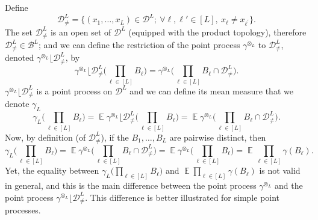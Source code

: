 \documentclass[twoside,11pt]{book}
\numberwithin{theorem}{chapter}
\numberwithin{definition}{chapter}
\numberwithin{proposition}{chapter}
\numberwithin{corollary}{chapter}
\numberwithin{example}{chapter}
\numberwithin{lemma}{chapter}
\numberwithin{assumption}{chapter}
\numberwithin{equation}{chapter}
\numberwithin{figure}{chapter}
\DeclareMathOperator{\EX}{\mathbb{E}}
\begin{document}
Define 
\begin{equation}
\mathcal{D}_{\neq}^{L} = \{ (x_{1}, \dots, x_{L}) \in \mathcal{D}^{L}; \: \forall \ell,\ell' \in [L], \: x_{\ell} \neq x_{\ell^{'}} \}.
\end{equation}
The set $\mathcal{D}_{\neq}^{L}$ is an open set of $\mathcal{D}^{L}$ (equipped with the product topology), therefore $\mathcal{D}_{\neq}^{L} \in \mathcal{B}^{L}$; and we can define the restriction of the point process $\gamma^{\otimes_L}$ to $\mathcal{D}_{\neq}^{L}$, denoted $\gamma^{\otimes_{L}} \lfloor \mathcal{D}_{\neq}^{L}$, by
\begin{equation}
\gamma^{\otimes_{L}} \lfloor \mathcal{D}_{\neq}^{L} \big(\prod\limits_{\ell \in [L]} B_\ell \big) = \gamma^{\otimes_{L}} \big( \prod\limits_{\ell \in [L]} B_\ell \cap \mathcal{D}_{\neq}^{L}   \big).
\end{equation}
$\gamma^{\otimes_{L}} \lfloor \mathcal{D}_{\neq}^{L}$ is a point process on $\mathcal{D}^L$ and we can define its mean measure that we denote $\gamma_L$ 
\begin{equation}
\gamma_{L} \big(\prod\limits_{\ell \in [L]} B_{\ell} \big)  = \EX \gamma^{\otimes_{L}} \lfloor \mathcal{D}_{\neq}^{L} \big( \prod\limits_{\ell \in [L]} B_{\ell} \big) = \EX \gamma^{\otimes_{L}} \big( \prod\limits_{\ell \in [L]} B_\ell \cap \mathcal{D}_{\neq}^{L}   \big).
\end{equation}
Now, by definition (of $\mathcal{D}_{\neq}^{L}$), if the $B_{1}, \dots, B_L$ are pairwise distinct, then 
\begin{equation}
\gamma_{L} \big(\prod\limits_{\ell \in [L]} B_{\ell} \big) = \EX \gamma^{\otimes_{L}} \big( \prod\limits_{\ell \in [L]} B_\ell \cap \mathcal{D}_{\neq}^{L}   \big) = \EX \gamma^{\otimes_{L}} \big( \prod\limits_{\ell \in [L]} B_{\ell} \big)  = \EX \prod\limits_{\ell \in [L]} \gamma(B_\ell).
\end{equation} 
Yet, the equality between $\gamma_{L} \big(\prod_{\ell \in [L]} B_{\ell} \big)$ and $\EX \prod_{\ell \in [L]} \gamma(B_\ell)$ is not valid in general, and this is  the main difference between the point process $\gamma^{\otimes_{L}}$ and the point process $\gamma^{\otimes_{L}} \lfloor \mathcal{D}_{\neq}^{L}$. This difference is better illustrated for simple point processes.
\end{document}

